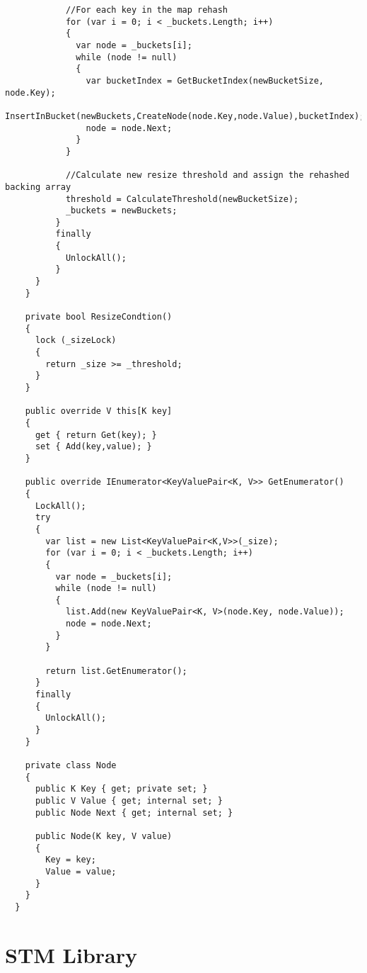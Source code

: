 \begin{lstlisting}
            //For each key in the map rehash
            for (var i = 0; i < _buckets.Length; i++)
            {
              var node = _buckets[i];
              while (node != null)
              {
                var bucketIndex = GetBucketIndex(newBucketSize, node.Key);
                InsertInBucket(newBuckets,CreateNode(node.Key,node.Value),bucketIndex);
                node = node.Next;
              }
            }

            //Calculate new resize threshold and assign the rehashed backing array
            threshold = CalculateThreshold(newBucketSize);
            _buckets = newBuckets;
          }
          finally
          {
            UnlockAll();
          }
      }
    }

    private bool ResizeCondtion()
    {
      lock (_sizeLock)
      {
        return _size >= _threshold;
      }
    }

    public override V this[K key]
    {
      get { return Get(key); }
      set { Add(key,value); }
    }

    public override IEnumerator<KeyValuePair<K, V>> GetEnumerator()
    {
      LockAll();
      try
      {
        var list = new List<KeyValuePair<K,V>>(_size);
        for (var i = 0; i < _buckets.Length; i++)
        {
          var node = _buckets[i];
          while (node != null)
          {
            list.Add(new KeyValuePair<K, V>(node.Key, node.Value));
            node = node.Next;
          }
        }

        return list.GetEnumerator();
      }
      finally
      {
        UnlockAll();
      }
    }

    private class Node
    {
      public K Key { get; private set; }
      public V Value { get; internal set; }
      public Node Next { get; internal set; }

      public Node(K key, V value)
      {
        Key = key;
        Value = value;
      }
    }
  }
\end{lstlisting}
\section{STM Library}\label{app:impl_stm_lib}
\section{\stmname}\label{app:impl_stm_lab}

